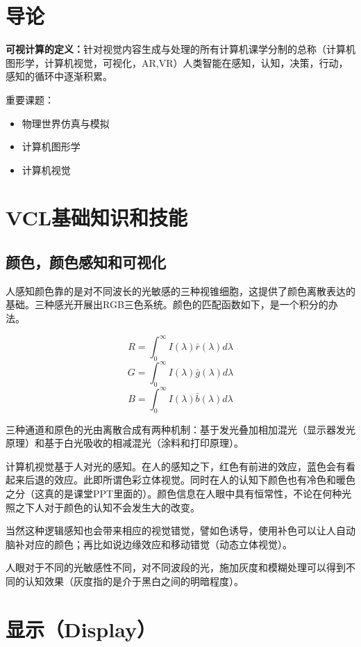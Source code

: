 \documentclass{ctexart}
\theoremstyle{cnthm}
\begin{document}
\section{导论}

\textbf{可视计算的定义：}针对视觉内容生成与处理的所有计算机课学分制的总称（计算机图形学，计算机视觉，可视化，AR,VR）人类智能在感知，认知，决策，行动，感知的循环中逐渐积累。

重要课题：
\begin{itemize}
    \item 物理世界仿真与模拟
    \item 计算机图形学
    \item 计算机视觉
\end{itemize}

\section{VCL基础知识和技能}

\subsection{颜色，颜色感知和可视化}

人感知颜色靠的是对不同波长的光敏感的三种视锥细胞，这提供了颜色离散表达的基础。三种感光开展出RGB三色系统。颜色的匹配函数如下，是一个积分的办法。

\[
R=\int_0^{\infty}I(\lambda)\bar{r}(\lambda)d\lambda
\]
\[
G=\int_0^{\infty}I(\lambda)\bar{g}(\lambda)d\lambda
\]
\[
B=\int_0^{\infty}I(\lambda)\bar{b}(\lambda)d\lambda
\]

三种通道和原色的光由离散合成有两种机制：基于发光叠加相加混光（显示器发光原理）和基于白光吸收的相减混光（涂料和打印原理）。

计算机视觉基于人对光的感知。在人的感知之下，红色有前进的效应，蓝色会有看起来后退的效应。此即所谓色彩立体视觉。同时在人的认知下颜色也有冷色和暖色之分（这真的是课堂PPT里面的）。颜色信息在人眼中具有恒常性，不论在何种光照之下人对于颜色的认知不会发生大的改变。

当然这种逻辑感知也会带来相应的视觉错觉，譬如色诱导，使用补色可以让人自动脑补对应的颜色；再比如说边缘效应和移动错觉（动态立体视觉）。

人眼对于不同的光敏感性不同，对不同波段的光，施加灰度和模糊处理可以得到不同的认知效果（灰度指的是介于黑白之间的明暗程度）。

\section{显示（Display）}
\end{document}

